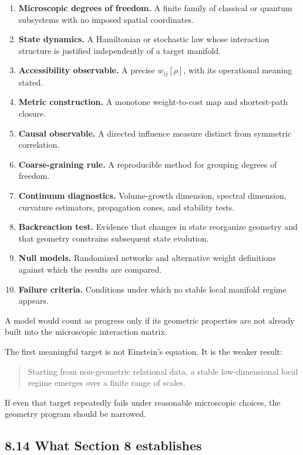 \documentclass[
  11pt,
]{article}
\providecommand{\tightlist}{%
  \setlength{\itemsep}{0pt}\setlength{\parskip}{0pt}}
\begin{document}
\begin{enumerate}
\def\labelenumi{\arabic{enumi}.}
\tightlist
\item
  \textbf{Microscopic degrees of freedom.} A finite family of classical
  or quantum subsystems with no imposed spatial coordinates.
\item
  \textbf{State dynamics.} A Hamiltonian or stochastic law whose
  interaction structure is justified independently of a target manifold.
\item
  \textbf{Accessibility observable.} A precise \(w_{ij}[\rho]\), with
  its operational meaning stated.
\item
  \textbf{Metric construction.} A monotone weight-to-cost map and
  shortest-path closure.
\item
  \textbf{Causal observable.} A directed influence measure distinct from
  symmetric correlation.
\item
  \textbf{Coarse-graining rule.} A reproducible method for grouping
  degrees of freedom.
\item
  \textbf{Continuum diagnostics.} Volume-growth dimension, spectral
  dimension, curvature estimators, propagation cones, and stability
  tests.
\item
  \textbf{Backreaction test.} Evidence that changes in state reorganize
  geometry and that geometry constrains subsequent state evolution.
\item
  \textbf{Null models.} Randomized networks and alternative weight
  definitions against which the results are compared.
\item
  \textbf{Failure criteria.} Conditions under which no stable local
  manifold regime appears.
\end{enumerate}

A model would count as progress only if its geometric properties are not
already built into the microscopic interaction matrix.

The first meaningful target is not Einstein's equation. It is the weaker
result:

\begin{quote}
Starting from non-geometric relational data, a stable low-dimensional
local regime emerges over a finite range of scales.
\end{quote}

If even that target repeatedly fails under reasonable microscopic
choices, the geometry program should be narrowed.

\subsection{8.14 What Section 8
establishes}\label{what-section-8-establishes}
\end{document}
